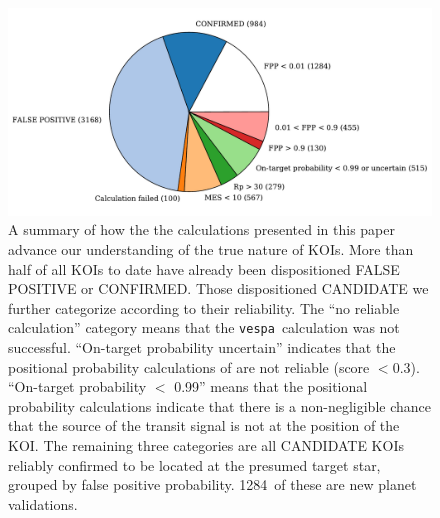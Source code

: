 \documentclass{emulateapj}
\newcommand{\figlabel}[1]{\label{fig:#1}}
\newcommand{\nvalnew}{1284} %
\newcommand{\nfpnew}{428}  %
\newcommand{\posprobthresh}{0.3}
\newcommand{\vespa}{\texttt{vespa}}
\begin{document}
\begin{figure}[p]
\begin{center}
\includegraphics[width=7in]{figures/fpp_pie.pdf}
\end{center}
\caption{A summary of how the the calculations presented in this paper
  advance our understanding of the true nature of KOIs.  More than
  half of all KOIs to date have already been dispositioned FALSE
  POSITIVE or CONFIRMED.  Those dispositioned CANDIDATE we further
  categorize according to their reliability.  The ``no reliable
  calculation'' category means that the \vespa\ calculation was
  not successful.  ``On-target
  probability uncertain'' indicates that the positional probability
  calculations of \citet{Bryson:KSCI} are not reliable (score $<
  \posprobthresh$).  ``On-target probability $<$ 0.99'' means that the positional
  probability calculations indicate that there is a non-negligible
  chance that the source of the transit signal is not at the position
  of the KOI.  The remaining three categories are all CANDIDATE KOIs
  reliably confirmed to be located at the presumed target star,
  grouped by false positive probability.  \nvalnew\ of these are new
  planet validations.%
  \figlabel{fpppie}}
\end{figure}
\end{document}
